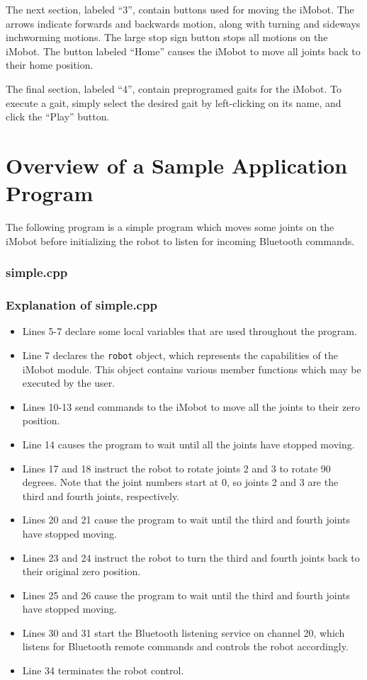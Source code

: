 \documentclass[11pt]{report}
\begin{document}
The next section, labeled ``3'', contain buttons used for moving the iMobot. 
The arrows indicate forwards and backwards motion, along with turning and
sideways inchworming motions. The large stop sign button stops all motions
on the iMobot. The button labeled ``Home'' causes the iMobot to move all joints
back to their home position. 

The final section, labeled ``4'', contain preprogramed gaits for the iMobot.
To execute a gait, simply select the desired gait by left-clicking on its name,
and click the ``Play'' button.

\chapter{Overview of a Sample Application Program}
The following program is a simple program which moves some joints on the iMobot
before initializing the robot to listen for incoming Bluetooth commands.
\subsection{simple.cpp \label{subsec:simple.cpp}}
\subsection{Explanation of simple.cpp}
\begin{itemize}
\item Lines 5-7 declare some local variables that are used throughout the program.
\item Line 7 declares the \texttt{robot} object, which represents the
capabilities of the iMobot module. This object contains various member
functions which may be executed by the user.
\item Lines 10-13 send commands to the iMobot to move all the joints to their
zero position.
\item Line 14 causes the program to wait until all the joints have stopped moving. 
\item Lines 17 and 18 instruct the robot to rotate joints 2 and 3 to rotate 90
degrees. Note that the joint numbers start at 0, so joints 2 and 3 are the
third and fourth joints, respectively. 
\item Lines 20 and 21 cause the program to wait until the third and fourth
joints have stopped moving.
\item Lines 23 and 24 instruct the robot to turn the third and fourth joints
back to their original zero position.
\item Lines 25 and 26 cause the program to wait until the third and fourth
joints have stopped moving.
\item Lines 30 and 31 start the Bluetooth listening service on channel 20,
which listens for Bluetooth remote commands and controls the robot accordingly. 
\item Line 34 terminates the robot control.
\end{itemize}
\end{document}
